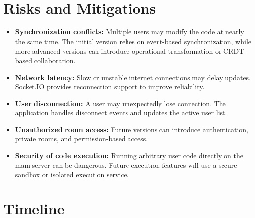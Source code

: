 \documentclass[11pt,letterpaper]{article}
\begin{document}

\section{Risks and Mitigations}

\begin{itemize}

    \item \textbf{Synchronization conflicts:}
    Multiple users may modify the code at nearly the same time. The initial version relies on event-based synchronization, while more advanced versions can introduce operational transformation or CRDT-based collaboration.

    \item \textbf{Network latency:}
    Slow or unstable internet connections may delay updates. Socket.IO provides reconnection support to improve reliability.

    \item \textbf{User disconnection:}
    A user may unexpectedly lose connection. The application handles disconnect events and updates the active user list.

    \item \textbf{Unauthorized room access:}
    Future versions can introduce authentication, private rooms, and permission-based access.

    \item \textbf{Security of code execution:}
    Running arbitrary user code directly on the main server can be dangerous. Future execution features will use a secure sandbox or isolated execution service.

\end{itemize}



\section{Timeline}
\end{document}

